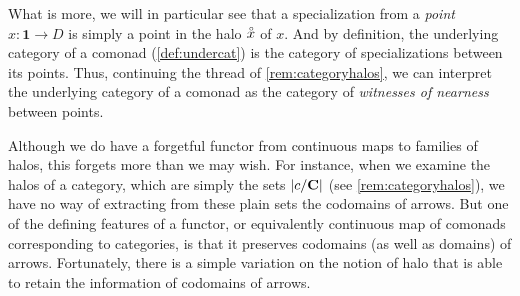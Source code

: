 \documentclass[11pt, oneside, article]{memoir}
\theoremstyle{plain}
\theoremstyle{definition}
\theoremstyle{remark}
\newenvironment{remark}
{\renewcommand\qedsymbol{$\lrcorner$}%
  \pushQED{\qed}\myremark}
{\popQED\endmyremark}
\DeclareMathOperator{\id}{id}
\DeclarePairedDelimiter{\abs}{\lvert}{\rvert}
\newcommand{\bang}{\mathrm{!}}
\newcommand{\namedcat}[1]{\mathbf{#1}}
\newcommand{\cat}[1]{\mathbf{#1}}
\newcommand{\Set}{\namedcat{Set}}
\newcommand{\clift}[1]{\overline{#1}}
\newcommand{\pts}[1]{{\abs{#1}}}
\newcommand{\one}[1]{\pts{#1}}
\newcommand{\halo}[1]{\accentset{\circ}{#1}}
\newcommand{\reindex}[1]{\Delta_{#1}}
\newcommand{\point}{\mathbf{1}}
\newcommand{\slicer}{\Delta_\bang}
\newcommand{\cmnd}[1]{{#1}}
\newcommand{\cC}{\cmnd{C}}
\newcommand{\cD}{\cmnd{D}}
\newcommand{\bC}{\cat{C}}
\newcommand{\SetpC}{\Set^\pts{\cC}}
\newcommand{\SetpD}{\Set^\pts{\cD}}
\begin{document}
\begin{remark}[Specializations]
  What is more, we will in particular see that a specialization from a
  \emph{point} $x \colon \point \to \cD$ is simply a point in the halo
  $\halo{x}$ of $x$. And by definition, the underlying category of a
  comonad (\cref{def:undercat}) is the category of specializations
  between its points. Thus, continuing the thread of
  \cref{rem:categoryhalos}, we can interpret the underlying category
  of a comonad as the category of \emph{witnesses of nearness} between
  points.
\end{remark}

Although we do have a forgetful functor from continuous maps to
families of halos, this forgets more than we may wish. For instance,
when we examine the halos of a category, which are simply the sets
$\pts{c/\bC}$ (see \cref{rem:categoryhalos}), we have no way of extracting
from these plain sets the codomains of arrows. But one of the defining
features of a functor, or equivalently continuous map of comonads
corresponding to categories, is that it preserves codomains (as well
as domains) of arrows. Fortunately, there is a simple variation on the
notion of halo that is able to retain the information of codomains of
arrows.
\end{document}
